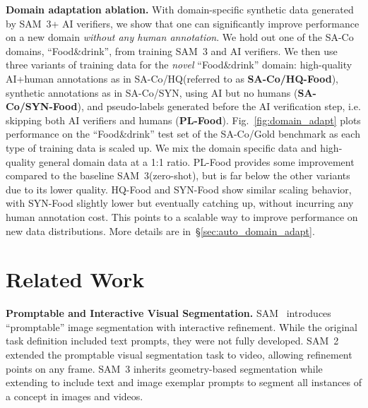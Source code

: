 \documentclass[]{fairmeta}
\newcommand{\samtwo}{SAM~2\xspace}
\newcommand{\model}{SAM~3\xspace}
\newcommand{\dsname}{{SA-Co}\xspace}
\newcommand{\trainhq}{{\dsname/HQ}\xspace}
\newcommand{\trainsyn}{{\dsname/SYN}\xspace}
\newcommand{\evalgold}{{\dsname/Gold}\xspace}
\renewcommand{\paragraph}[1]{%
	\noindent\textbf{#1.}\noindent\xspace%
}
\begin{document}
\paragraph{Domain adaptation ablation} With domain-specific synthetic data generated by \model + AI verifiers, we show that one can significantly improve performance on a new domain \textit{without any human annotation}. We hold out one of the \dsname domains, ``Food\&drink'', from training   \model and AI verifiers. We then use three variants of training data for the \emph{novel} ``Food\&drink'' domain: high-quality AI+human annotations as in \trainhq (referred to as \textbf{\trainhq-Food}), synthetic annotations as in \trainsyn, using AI but no humans (\textbf{\trainsyn-Food}), and pseudo-labels generated before the AI verification step, i.e. skipping both AI verifiers and humans (\textbf{PL-Food}).
Fig.~\ref{fig:domain_adapt} plots performance on the ``Food\&drink'' test set of the \evalgold benchmark as each type of training data is scaled up. We mix the domain specific data and high-quality general domain data at a 1:1 ratio. PL-Food provides some improvement compared to the baseline \model (zero-shot), but is far below the other variants due to its lower quality. HQ-Food and SYN-Food show similar scaling behavior, with SYN-Food slightly lower but eventually catching up, without incurring any human annotation cost. This points to a scalable way to improve performance on new data distributions. More details are in~\S\ref{sec:auto_domain_adapt}.

\vspace{-20pt}
\section{Related Work} \label{sec:related}
\vspace{-5pt}

\textbf{Promptable and Interactive Visual Segmentation.}
SAM~\citep{sam} introduces ``promptable'' image segmentation with interactive refinement. While the original task definition included text prompts, they were not fully developed. 
\samtwo~\citep{sam2} extended the promptable visual segmentation task to video, allowing refinement points on any frame. \model inherits geometry-based segmentation while extending to include text and image exemplar prompts to segment all instances of a  concept in images and videos.
\end{document}

